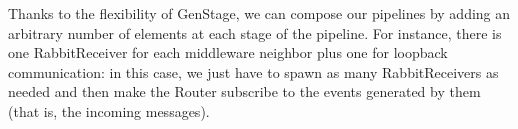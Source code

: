 Thanks to the flexibility of GenStage, we can compose our pipelines by adding
an arbitrary number of elements at each stage of the pipeline. For instance,
there is one RabbitReceiver for each middleware neighbor plus one for loopback
communication: in this case, we just have to spawn as many RabbitReceivers as
needed and then make the Router subscribe to the events generated by them
(that is, the incoming messages).

